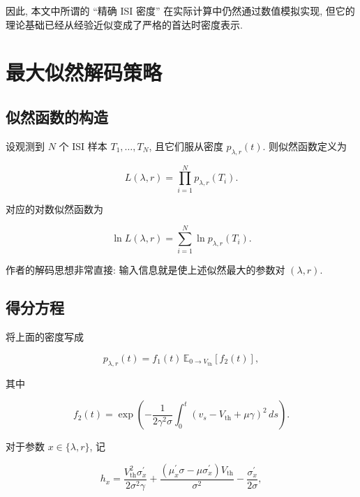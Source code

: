 \documentclass[oneside]{ctexart}
\begin{document}
因此, 本文中所谓的 ``精确 ISI 密度'' 在实际计算中仍然通过数值模拟实现, 但它的理论基础已经从经验近似变成了严格的首达时密度表示.

\section{最大似然解码策略}

\subsection{似然函数的构造}

设观测到 $N$ 个 ISI 样本 $T_1,\dots,T_N$, 且它们服从密度 $p_{\lambda,r}(t)$. 则似然函数定义为

\begin{equation}
    L(\lambda,r)=\prod\limits_{i=1}^{N}p_{\lambda,r}(T_i).
\end{equation}

对应的对数似然函数为

\begin{equation}
    \ln L(\lambda,r)=\sum\limits_{i=1}^{N}\ln p_{\lambda,r}(T_i).
\end{equation}

作者的解码思想非常直接: 输入信息就是使上述似然最大的参数对 $(\lambda,r)$.

\subsection{得分方程}

将上面的密度写成

\begin{equation}
    p_{\lambda,r}(t)=f_1(t)\,\mathbb{E}_{0\to V_{\mathrm{th}}}[f_2(t)],
\end{equation}

其中

\begin{equation}
    f_2(t)
    =
    \exp\left(
    -\dfrac{1}{2\gamma^2\sigma}
    \int_0^t
    (v_s-V_{\mathrm{th}}+\mu\gamma)^2\,ds
    \right).
\end{equation}

对于参数 $x\in\{\lambda,r\}$, 记

\begin{equation}
    h_x
    =
    \dfrac{V_{\mathrm{th}}^2\sigma_x^{'}}{2\sigma^2\gamma}
    +
    \dfrac{(\mu_x^{'}\sigma-\mu\sigma_x^{'})V_{\mathrm{th}}}{\sigma^2}
    -
    \dfrac{\sigma_x^{'}}{2\sigma},
\end{equation}
\end{document}
